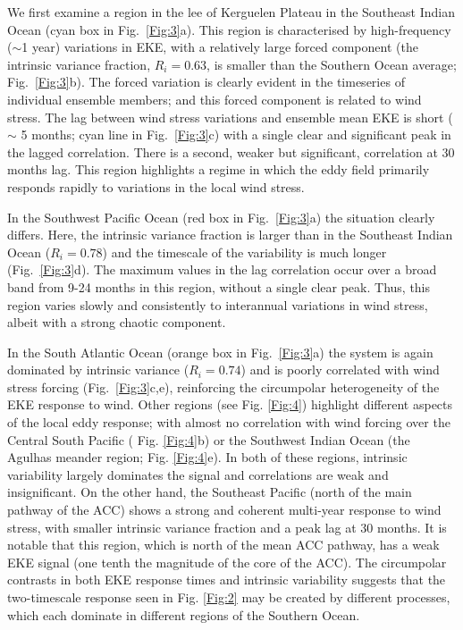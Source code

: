 \documentclass[linenumbers]{agujournal2019}
\begin{document}
We first examine a region in the lee of Kerguelen Plateau in the Southeast Indian Ocean (cyan box in Fig.~\ref{Fig:3}a).
This region is characterised by high-frequency ($\sim$1 year) variations in EKE, with a relatively large forced component (the intrinsic variance fraction, $R_i = 0.63$, is smaller than the Southern Ocean average; Fig.~\ref{Fig:3}b).
The forced variation is clearly evident in the timeseries of  individual ensemble members; and this forced component is related to wind stress.
The lag between wind stress variations and ensemble mean EKE is short ($\sim$ 5 months; cyan line in Fig.~\ref{Fig:3}c) with a single clear  and significant peak in the lagged correlation.
There is a second, weaker but significant, correlation at 30 months lag.
This region highlights a regime in which the eddy field primarily responds rapidly to variations in the local wind stress.

In the Southwest Pacific Ocean (red box in Fig.~\ref{Fig:3}a) the situation clearly differs.
Here, the intrinsic variance fraction is larger than in the Southeast Indian Ocean ($R_i=0.78$) and the timescale of the variability is much longer (Fig.~\ref{Fig:3}d).
The maximum values in the lag correlation occur over a broad band from 9-24 months in this region, without a single clear peak.
Thus, this region varies slowly and consistently to interannual variations in wind stress, albeit with a strong chaotic component.

In the South Atlantic Ocean (orange box in Fig.~\ref{Fig:3}a) the system is again dominated by intrinsic variance ($R_i=0.74$) and is poorly correlated with wind stress forcing (Fig.~\ref{Fig:3}c,e), reinforcing the circumpolar heterogeneity of the EKE response to wind.
Other regions (see Fig. \ref{Fig:4}) highlight different aspects of the local eddy response;  with almost no correlation with wind forcing over the Central South Pacific ( Fig. \ref{Fig:4}b) or the Southwest Indian Ocean  (the Agulhas meander region; Fig. \ref{Fig:4}e).
In both of these regions, intrinsic variability largely dominates the signal and correlations are weak and insignificant. 
On the other hand, the Southeast Pacific (north of the main pathway of the ACC) shows a strong and coherent multi-year response to wind stress, with smaller intrinsic variance fraction and a peak lag at 30 months.
It is notable that this region, which is north of the mean ACC pathway, has a weak EKE signal (one tenth the magnitude of the core of the ACC).
The circumpolar contrasts in both EKE response times and intrinsic variability suggests that the two-timescale response seen in Fig. \ref{Fig:2} may be created by different processes, which each dominate in different regions of the Southern Ocean.
\end{document}
